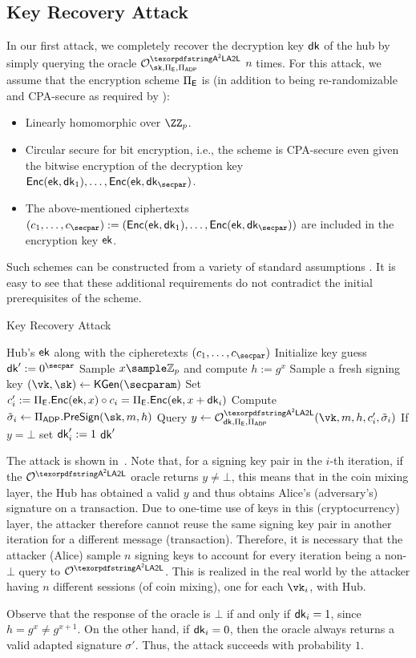 \subsection{Key Recovery Attack}\label{sec:attack1}

In our first attack, we completely recover the decryption key $\mathsf{dk}$ of the hub by simply querying the oracle $\oracle^{\AAL}_{\sk,\Pi_\ENC,\Pi_\ADP}$ $n$ times. For this attack, we assume that the encryption scheme $\Pi_{\mathsf{E}}$ is (in addition to being re-randomizable and CPA-secure as required by \aal):
\begin{itemize}
    \item Linearly homomorphic over $\ZZ_p$.
    \item Circular secure for bit encryption, i.e., the scheme is CPA-secure even given the bitwise encryption of the decryption key $\enc(\ek, \dk_1), \dots,\allowbreak \enc(\ek,\allowbreak \dk_\secpar)$.
    \item The above-mentioned ciphertexts $(c_1, \dots, c_\secpar) := (\enc(\ek, \dk_1), \dots,\allowbreak  \enc(\ek, \dk_\secpar))$ are included in the encryption key $\mathsf{ek}$.
\end{itemize}
Such schemes can be constructed from a variety of standard assumptions \cite{C:BHHO08}. It is easy to see that these additional requirements do not contradict the initial prerequisites of the scheme. 


\begin{algorithm}
\caption{Key Recovery Attack}
\label{alg:key-rec}
\begin{algorithmic}[1]
\small
\REQUIRE Hub's $\mathsf{ek}$ along with the cipheretexts $(c_1, \dots, c_\secpar)$
\STATE Initialize key guess $\dk' := 0^\secpar$
    \STATE Sample $x \sample \mathbb{Z}_p$ and compute $h := g^x$
    \STATE Sample a fresh signing key $(\vk, \sk) \gets \kgen(\secparam)$
    \STATE Set $c'_i := \Pi_{\mathsf{E}}.{\mathsf{Enc}}(\mathsf{ek},x) \circ c_i = \Pi_{\mathsf{E}}.{\mathsf{Enc}}(\mathsf{ek},x + \mathsf{dk}_i)$
    \STATE Compute  $\presig_i \gets \Pi_\ADP.\presign(\sk,m,h)$
    \STATE Query $y \gets \oracle^{\AAL}_{\dk,\Pi_\ENC,\Pi_\ADP}(\vk,m,h,c_i',\presig_i)$
    \STATE If $y =\bot$ set $\mathsf{dk}_i' := 1$
\ENDFOR
\RETURN $\mathsf{dk}'$
\end{algorithmic}
\end{algorithm}

The attack is shown in~. Note that, for a signing key pair in the $i$-th iteration, if the $\oracle^\AAL$ oracle returns $y \ne \bot$, this means that in the coin mixing layer, the Hub has obtained a valid $y$ and thus obtains Alice's (adversary's) signature on a transaction. Due to one-time use of keys in this (cryptocurrency) layer, the attacker therefore cannot reuse the same signing key pair in another iteration for a different message (transaction). Therefore, it is necessary that the attacker (Alice) sample $n$ signing keys to account for every iteration being a non-$\bot$ query to $\oracle^\AAL$.
This is realized in the real world by the attacker having $n$ different sessions (of coin mixing), one for each $\vk_i$, with Hub. 

Observe that the response of the oracle is $\bot$ if and only if $\mathsf{dk}_i = 1$, since $h = g^x \neq g^{x + 1}$. On the other hand, if $\mathsf{dk}_i = 0$, then the oracle always returns a valid adapted signature $\sigma'$. Thus, the attack succeeds with probability $1$.